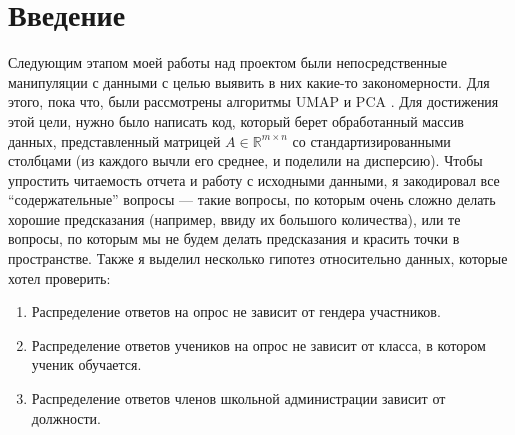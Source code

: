 \section{Введение} \label{sec:intro}

Следующим этапом моей работы над проектом были непосредственные манипуляции с данными с целью выявить в них какие-то закономерности.
Для этого, пока что, были рассмотрены алгоритмы UMAP \cite{umap} и PCA \cite{pca}.
Для достижения этой цели, нужно было написать код, который берет обработанный массив данных, представленный матрицей $A \in \mathbb{R}^{m \times n}$ со стандартизированными столбцами (из каждого вычли его среднее, и поделили на дисперсию).
Чтобы упростить читаемость отчета и работу с исходными данными, я закодировал все \enquote{содержательные} вопросы --- такие вопросы, по которым очень сложно делать хорошие предсказания (например, ввиду их большого количества), или те вопросы, по которым мы не будем делать предсказания и красить точки в пространстве.
Также я выделил несколько гипотез относительно данных, которые хотел проверить:
\begin{enumerate}
    \item Распределение ответов на опрос не зависит от гендера участников.
    \item Распределение ответов учеников на опрос не зависит от класса, в котором ученик обучается.
    \item Распределение ответов членов школьной администрации зависит от должности.
\end{enumerate}